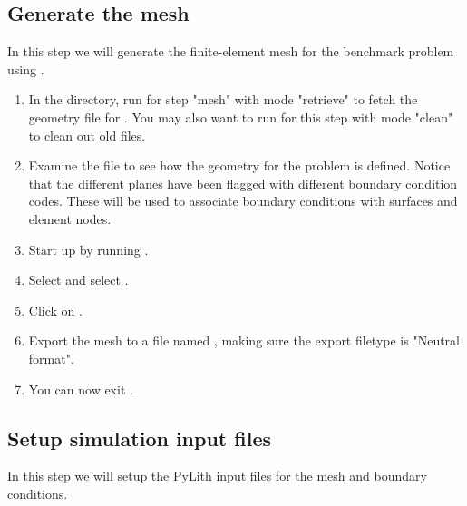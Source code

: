 \subsection{Generate the mesh}

In this step we will generate the finite-element mesh for the
benchmark problem using .

\begin{enumerate}
\item In the  directory, run
   for step "mesh" with mode "retrieve" to fetch the
  geometry file for . You may also want to run
   for this step with mode "clean" to clean out old
  files.

  \begin{screen}
    \shellprompt{}
    \shellprompt{}
  \end{screen}
  
\item Examine the  file to see how the geometry
  for the problem is defined. Notice that the different planes have
  been flagged with different boundary condition codes. These will be
  used to associate boundary conditions with surfaces and element
  nodes.
\item Start up  by running .

  \begin{screen}
    \shellprompt{}
  \end{screen}
  
\item Select \guiselect{}
  and select .
\item Click on .
\item Export the mesh to a file named ,
  making sure the export filetype is "Neutral format".
\item You can now exit .
\end{enumerate}

\subsection{Setup simulation input files}

In this step we will setup the PyLith input files for the mesh and
boundary conditions.

